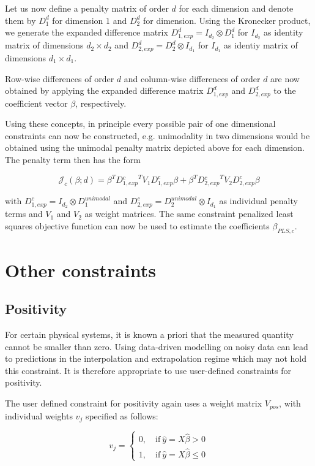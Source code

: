 \documentclass[10pt,a4paper]{article}
\begin{document}
	Let us now define a penalty matrix of order $d$ for each dimension and denote them by $D_1^d$ for dimension $1$ and $D_2^d$ for dimension. Using the Kronecker product, we generate the expanded difference matrix $D_{1, exp}^d = I_{d_2} \otimes D_1^d$ for $I_{d_2}$ as identity matrix of dimensions $d_2 \times d_2$ and $D_{2,exp}^d = D_2^d \otimes I_{d_1}$ for $I_{d_1}$ as identiy matrix of dimensions $d_1 \times d_1$. 
	
	Row-wise differences of order $d$ and column-wise differences of order $d$ are now obtained by applying the expanded difference matrix $D_{1,exp}^d$ and $D_{2,exp}^d$ to the coefficient vector $\beta$, respectively. 
	
	Using these concepts, in principle every possible pair of one dimensional constraints can now be constructed, e.g. unimodality in two dimensions would be obtained using the unimodal penalty matrix depicted above for each dimension. The penalty term then has the form
	
	$$\mathcal J_c(\beta; d) = \beta^T D{^c_{1,exp}}^T V_1 D_{1,exp}^c \beta + \beta^T D{^c_{2,exp}}^T V_2D_{2,exp}^c \beta$$
	
	with $D_{1,exp}^c = I_{d_2} \otimes D_1^{unimodal}$ and $D_{2,exp}^c = D_2^{unimodal} \otimes I_{d_1}$ as individual penalty terms and $V_1$ and $V_2$ as weight matrices. The same constraint penalized least squares objective function can now be used to estimate the coefficients $\beta_{PLS,c}$.
	
	\section{Other constraints}
	
	\subsection{Positivity}
	
	For certain physical systems, it is known a priori that the measured quantity cannot be smaller than zero. Using data-driven modelling on noisy data can lead to predictions in the interpolation and extrapolation regime which may not hold this constraint. It is therefore appropriate to use user-defined constraints for positivity.
	
	The user defined constraint for positivity again uses a weight matrix $V_{pos}$, with individual weights $v_j$ specified as follows:
	
	$$v_j = \begin{cases} 0, \quad \text{if} \ \hat y = X\hat \beta > 0\\ 1, \quad \text{if} \ \hat y = X \hat \beta \le 0 \end{cases}$$
	
\end{document}
